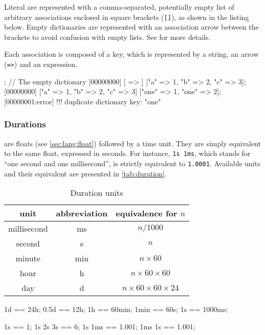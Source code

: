 Literal  are represented with a comma-separated,
potentially empty list of arbitrary associations enclosed in square brackets
(\lstinline|[]|), as shown in the listing below.  Empty dictionaries are
represented with an association arrow between the brackets to avoid
confusion with empty lists.  See  for more details.

Each association is composed of a key, which is represented by a string, an
arrow (\lstinline|=>|) and an expression.

\begin{urbiscript}
[ => ]; // The empty dictionary
[00000000] [ => ]
["a" => 1, "b" => 2, "c" => 3];
[00000000] ["a" => 1, "b" => 2, "c" => 3]
["one" => 1, "one" => 2];
[00000001:error] !!! duplicate dictionary key: "one"
\end{urbiscript}

\subsubsection{Durations}

 are floats (see \autoref{sec:lang:float})
followed by a time unit. They are simply equivalent to the same float,
expressed in seconds. For instance, \lstinline|1s 1ms|, which stands
for ``one second and one millisecond'', is strictly equivalent to
\lstinline|1.0001|. Available units and their equivalent are presented
in \autoref{tab:duration}.

\begin{table}
  \centering
  \begin{tabular}{|c|c|c|}
    \hline
    unit        & abbreviation & equivalence for $n$  \\
    \hline
    millisecond & ms           & $n / 1000$         \\
    second      & s            & $n$                \\
    minute      & min          & $n \times 60$           \\
    hour        & h            & $n \times 60 \times 60$      \\
    day         & d            & $n \times 60 \times 60 \times 24$ \\
    \hline
  \end{tabular}
  \caption{Duration units}
  \label{tab:duration}
\end{table}

\begin{urbiassert}
1d   == 24h;
0.5d == 12h;
1h   == 60min;
1min == 60s;
1s   == 1000ms;


1s == 1;
1s 2s 3s == 6;
1s 1ms == 1.001;
1ms 1s == 1.001;
\end{urbiassert}

